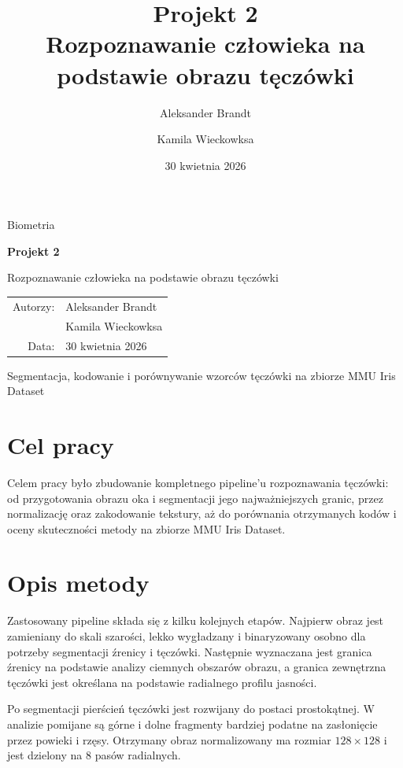 \documentclass[12pt,a4paper]{article}
\title{\vspace{-1.8cm}\Huge Projekt 2\\[0.3cm]\LARGE Rozpoznawanie cz{\l}owieka na podstawie obrazu t\k{e}cz\'owki}
\author{Aleksander Brandt \and Kamila Wieckowksa}
\date{30 kwietnia 2026}
\begin{document}
\begin{titlepage}
    \centering
    {\Large Biometria\par}
    \vspace{1.8cm}
    {\Huge\bfseries Projekt 2\par}
    \vspace{0.4cm}
    {\LARGE Rozpoznawanie cz{\l}owieka na podstawie obrazu t\k{e}cz\'owki\par}
    \vspace{2cm}
    {\large
    \begin{tabular}{rl}
    Autorzy: & Aleksander Brandt \\
             & Kamila Wieckowksa \\
    Data:    & 30 kwietnia 2026 \\
    \end{tabular}\par}
    \vfill
    {\large Segmentacja, kodowanie i por\'ownywanie wzorc\'ow t\k{e}cz\'owki na zbiorze MMU Iris Dataset\par}
\end{titlepage}

\section{Cel pracy}
Celem pracy by{\l}o zbudowanie kompletnego pipeline'u rozpoznawania t\k{e}cz\'owki: od przygotowania obrazu oka i segmentacji jego najwa\.zniejszych granic, przez normalizacj\k{e} oraz zakodowanie tekstury, a\.z do por\'ownania otrzymanych kod\'ow i oceny skuteczno\'sci metody na zbiorze MMU Iris Dataset.

\section{Opis metody}
Zastosowany pipeline sk{\l}ada si\k{e} z kilku kolejnych etap\'ow. Najpierw obraz jest zamieniany do skali szaro\'sci, lekko wyg{\l}adzany i binaryzowany osobno dla potrzeby segmentacji \'zrenicy i t\k{e}cz\'owki. Nast\k{e}pnie wyznaczana jest granica \'zrenicy na podstawie analizy ciemnych obszar\'ow obrazu, a granica zewn\k{e}trzna t\k{e}cz\'owki jest okre\'slana na podstawie radialnego profilu jasno\'sci.

Po segmentacji pier\'scie\'n t\k{e}cz\'owki jest rozwijany do postaci prostok\k{a}tnej. W analizie pomijane s\k{a} g\'orne i dolne fragmenty bardziej podatne na zas{\l}oni\k{e}cie przez powieki i rz\k{e}sy. Otrzymany obraz normalizowany ma rozmiar $128 \times 128$ i jest dzielony na 8 pas\'ow radialnych.
\end{document}
